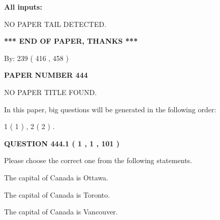 \documentclass[12pt]{article}
\begin{document}
   
   
   
\noindent{}
   
   
   
   
\noindent\vspace{0.1in}\hspace{-0.08in} {\textbf{\Large{All inputs: }}}
   
   
   
   
\vspace{2.0in} NO PAPER TAIL DETECTED.
   
   
   
   
\vspace{1.0in} 
{\textbf{\large{ *** END OF PAPER, THANKS *** }}} 
   
   
\hspace{1.0in} By: 
 239 ( 416 ,  458 )
   
   
   
   
\newpage 
\setcounter{page}{ 
   444001 } 
   
   
   
   
 {\textbf{ \Large{ PAPER NUMBER  444  }}}
   
   
\vspace{0.2in}
   
   
   
   
   
   
 NO PAPER TITLE FOUND.
   
   
   
\vspace{0.2in}
   
In this paper, big questions will be generated in the following order: 
   
   
   1 ( 1 )
 ,
   2 ( 2 )
 .
  
\vspace{0.2in}
  
{\textbf{\Large{QUESTION
444.1 
 ( 1 , 1 , 101 )
}}}
  
  
Please choose the correct one from the following statements.
 
 
The capital of Canada is Ottawa.
 
 
The capital of Canada is Toronto.
 
 
The capital of Canada is Vancouver.
 
\end{document}
